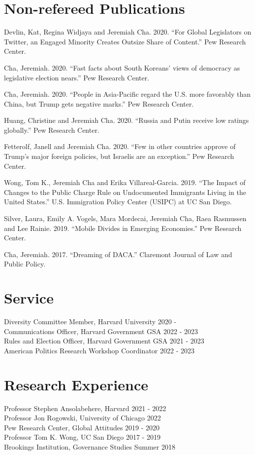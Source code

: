 \documentclass[margin, line]{res}
\begin{document}
\begin{resume}
\section{Non-refereed Publications}
\begin{etaremune}
	\item Devlin, Kat, Regina Widjaya and Jeremiah Cha. 2020. ``For Global Legislators on Twitter, an Engaged Minority Creates Outsize Share of Content.'' Pew Research Center.
	\item Cha, Jeremiah. 2020. ``Fast facts about South Koreans’ views of democracy as legislative election nears.'' Pew Research Center.
	\item Cha, Jeremiah. 2020. ``People in Asia-Pacific regard the U.S. more favorably than China, but Trump gets negative marks.'' Pew Research Center.
	\item Huang, Christine and Jeremiah Cha. 2020. ``Russia and Putin receive low ratings globally.'' Pew Research Center.
	\item Fetterolf, Janell and Jeremiah Cha. 2020. ``Few in other countries approve of Trump’s major foreign policies, but Israelis are an exception.'' Pew Research Center.
	\item Wong, Tom K., Jeremiah Cha and Erika Villareal-Garcia. 2019. ``The Impact of Changes to the Public Charge Rule on Undocumented Immigrants Living in the United States.'' U.S. Immigration Policy Center (USIPC) at UC San Diego.
	\item Silver, Laura, Emily A. Vogels, Mara Mordecai, Jeremiah Cha, Raea Rasmussen and Lee Rainie. 2019. ``Mobile Divides in Emerging Economies.'' Pew Research Center.
	\item Cha, Jeremiah. 2017. ``Dreaming of DACA.'' Claremont Journal of Law and Public Policy.
\end{etaremune}

\section{Service}
Diversity Committee Member, Harvard University \hfill 2020 - \\
Communications Officer, Harvard Government GSA \hfill 2022 - 2023\\
Rules and Election Officer, Harvard Government GSA \hfill 2021 - 2023\\
American Politics Research Workshop Coordinator \hfill 2022 - 2023\\

\section{Research Experience}
Professor Stephen Ansolabehere, Harvard \hfill 2021 - 2022\\
Professor Jon Rogowski, University of Chicago \hfill 2022\\
Pew Research Center, Global Attitudes \hfill 2019 - 2020\\
Professor Tom K. Wong, UC San Diego \hfill 2017 - 2019\\
Brookings Institution, Governance Studies \hfill Summer 2018


\end{resume}
\end{document}
